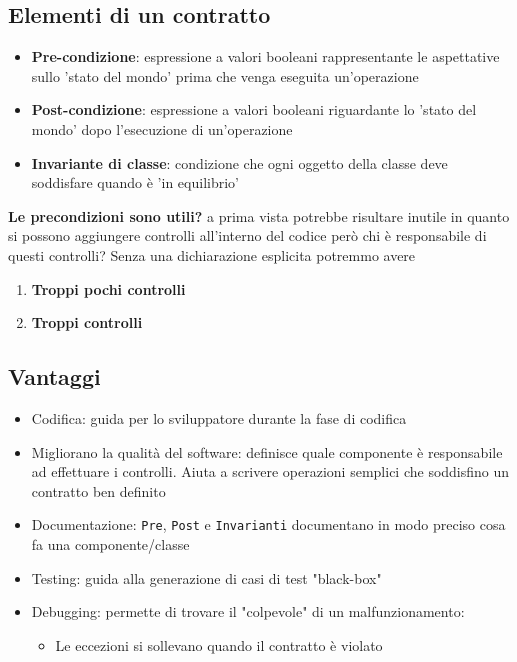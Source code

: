 \documentclass[12pt, a4paper]{report}
\begin{document}
\subsection{Elementi di un contratto}
\begin{itemize}
    \item \textbf{Pre-condizione}: espressione a valori booleani rappresentante le aspettative sullo 'stato del mondo' prima che venga eseguita un'operazione
    \item \textbf{Post-condizione}: espressione a valori booleani riguardante lo 'stato del mondo' dopo l'esecuzione di un'operazione
    \item \textbf{Invariante di classe}: condizione che ogni oggetto della classe deve soddisfare quando è 'in equilibrio'
\end{itemize}
\textbf{Le precondizioni sono utili?} a prima vista potrebbe risultare inutile in quanto si possono aggiungere controlli all'interno del codice però chi è responsabile di questi controlli? Senza una dichiarazione esplicita  potremmo avere \begin{enumerate}
    \item \textbf{Troppi pochi controlli}
    \item \textbf{Troppi controlli}
\end{enumerate}
\subsection{Vantaggi}
\begin{itemize}
    \item Codifica: guida per lo sviluppatore durante la fase di codifica
    \item Migliorano la qualità del software: definisce quale componente è responsabile ad effettuare i controlli. Aiuta a scrivere operazioni semplici  che soddisfino un contratto ben definito
    \item Documentazione: \texttt{Pre}, \texttt{Post} e \texttt{Invarianti} documentano in  modo preciso cosa fa una componente/classe
    \item Testing: guida alla generazione di casi di test "black-box"
    \item Debugging: permette di trovare il "colpevole" di un malfunzionamento: \begin{itemize}
        \item Le eccezioni si sollevano quando il contratto è violato
    \end{itemize}
\end{itemize}
\end{document}
